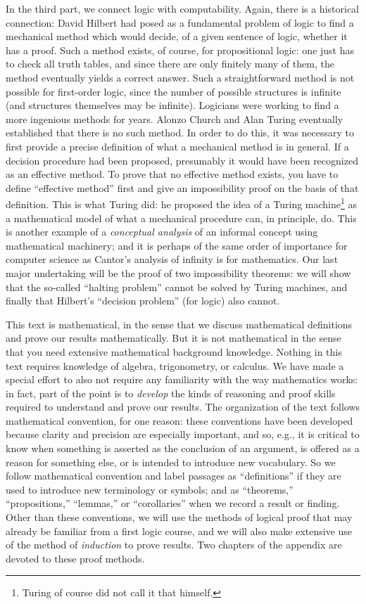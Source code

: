 In the third part, we connect logic with computability. Again, there
is a historical connection: David Hilbert had posed as a fundamental
problem of logic to find a mechanical method which would decide, of a
given sentence of logic, whether it has a proof. Such a method exists,
of course, for propositional logic: one just has to check all truth
tables, and since there are only finitely many of them, the method
eventually yields a correct answer. Such a straightforward method is
not possible for first-order logic, since the number of possible
structures is infinite (and structures themselves may be
infinite). Logicians were working to find a more ingenious methods for
years. Alonzo Church and Alan Turing eventually established that
there is no such method. In order to do this, it was necessary to
first provide a precise definition of what a mechanical method is in
general. If a decision procedure had been proposed, presumably it
would have been recognized as an effective method. To prove that no
effective method exists, you have to define ``effective method'' first
and give an impossibility proof on the basis of that definition. This
is what Turing did: he proposed the idea of a Turing
machine\footnote{Turing of course did not call it that himself.} as a
mathematical model of what a mechanical procedure can, in principle,
do. This is another example of a \emph{conceptual analysis} of an
informal concept using mathematical machinery; and it is perhaps of
the same order of importance for computer science as Cantor's analysis
of infinity is for mathematics. Our last major undertaking will be
the proof of two impossibility theorems: we will show that the
so-called ``halting problem'' cannot be solved by Turing machines, and
finally that Hilbert's ``decision problem'' (for logic) also cannot.

This text is mathematical, in the sense that we discuss mathematical
definitions and prove our results mathematically. But it is not
mathematical in the sense that you need extensive mathematical
background knowledge. Nothing in this text requires knowledge of
algebra, trigonometry, or calculus. We have made a special effort to
also not require any familiarity with the way mathematics works: in
fact, part of the point is to \emph{develop} the kinds of reasoning
and proof skills required to understand and prove our results. The
organization of the text follows mathematical convention, for one
reason: these conventions have been developed because clarity and
precision are especially important, and so, e.g., it is critical to
know when something is asserted as the conclusion of an argument, is
offered as a reason for something else, or is intended to introduce
new vocabulary. So we follow mathematical convention and label
passages as ``definitions'' if they are used to introduce new
terminology or symbols; and as ``theorems,'' ``propositions,''
``lemmas,'' or ``corollaries'' when we record a result or finding.
Other than these conventions, we will use the methods of logical proof
that may already be familiar from a first logic course, and we will
also make extensive use of the method of \emph{induction} to prove
results. Two chapters of the appendix are devoted to these proof
methods.

